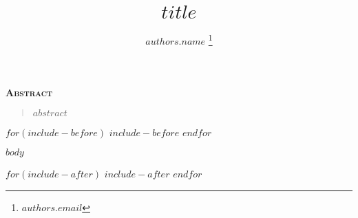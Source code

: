 \documentclass{article}
\title{$title$}
\author[$authors.number$]{$authors.name$ \thanks{$authors.email$}}
\affil[$affiliations.number$]{$affiliations.department$, $affiliations.institution$}
\renewenvironment{abstract}
{
  \centerline
  {\large \bfseries \scshape Abstract}
  \begin{quote}
}
{
  \end{quote}
}
\begin{document}
\maketitle
\begin{abstract}
$abstract$
\end{abstract}

$for(include-before)$
$include-before$
$endfor$

$body$

%
%

$for(include-after)$
$include-after$
$endfor$
\end{document}
